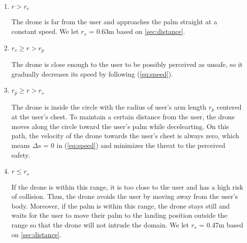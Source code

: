 \begin{enumerate}
    \item $r > r_v$
    
    The drone is far from the user and approaches the palm straight at a constant speed.
    We let $r_v$ = 0.63m based on \ref{sec:distance}.

    \item $r_v \geq r > r_p$
    
    The drone is close enough to the user to be possibly perceived as unsafe, so it gradually decreases its speed by following (\ref{eq:speed}).

    \item $r_p \geq r > r_s$
    
    The drone is inside the circle with the radius of user's arm length $r_p$ centered at the user's chest.
    To maintain a certain distance from the user, the drone moves along the circle toward the user's palm while decelearting.
    On this path, the velocity of the drone towards the user's chest is always zero,
    which means $\Delta s$ = 0 in (\ref{eq:speed}) and minimizes the threat to the perceived safety.

    \item $r \leq r_s$
    \label{sec:innermost}
    
    If the drone is within this range, it is too close to the user and has a high risk of collision.
    Thus, the drone avoids the user by moving away from the user's body.
    Moreover, if the palm is within this range, the drone stays still and waits for the user to move their palm to the landing position outside the range so that the drone will not intrude the domain.
    We let $r_s$ = 0.47m based on \ref{sec:distance}.

\end{enumerate}